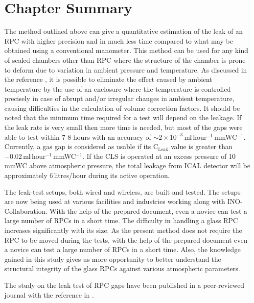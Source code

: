 \section{Chapter Summary}
The method outlined above can give a quantitative estimation of the
leak of an RPC with higher precision and in much less time compared to
what may be obtained using a conventional manometer. This method can
be used for any kind of sealed chambers other than RPC where the
structure of the chamber is prone to deform due to variation in
ambient pressure and temperature. As discussed in the reference
\cite{rpcleak2016}, it is possible to eliminate the effect caused by
ambient temperature by the use of an enclosure where the temperature
is controlled precisely in case of abrupt and/or irregular changes in
ambient temperature, causing difficulties in the calculation of volume
correction factors. It should be noted that the minimum time required
for a test will depend on the leakage. If the leak rate is very small
then more time is needed, but most of the gaps were able to test
within 7-8 hours with an accuracy of
$\sim 2\times 10^{-3}$\,ml\,hour$^{-1}$\,mmWC$^{-1}$. Currently, a gas
gap is considered as usable if its $\textrm{C}_{\textrm{Leak}}$ value is
greater than $-0.02$\,ml\,hour$^{-1}$\,mmWC$^{-1}$. If the CLS is
operated at an excess pressure of 10\,mmWC above atmospheric pressure,
the total leakage from ICAL detector will be approximately
6\,litres/hour during its active operation.

The leak-test setups, both wired and wireless, are built and tested.
The setups are now being used at various facilities and industries
working along with INO-Collaboration. With the help of the prepared
document, even a novice can test a large number of RPCs in a short
time. The difficulty in handling a glass RPC increases significantly
with its size. As the present method does not require the RPC to be
moved during the tests, with the help of the prepared document even
a novice can test a large number of RPCs in a short time. Also, the
knowledge gained in this study gives us more opportunity to better
understand the structural integrity of the glass RPCs against various
atmospheric parameters.

The study on the leak test of RPC gaps have been published in a
peer-reviewed journal with the reference in \cite{rpcleak}.
